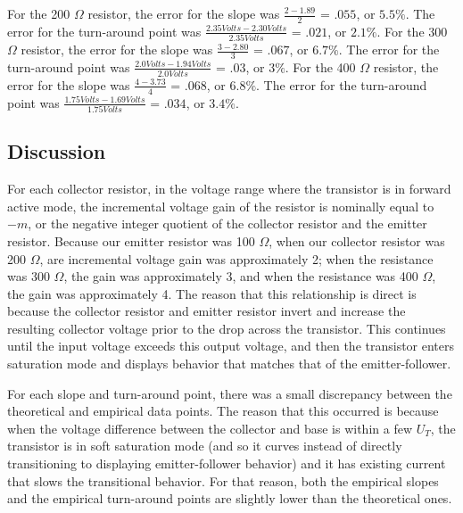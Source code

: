 \documentclass{article}
\begin{document}
For the 200 $\Omega$ resistor, the error for the slope was $\frac{2-1.89}{2}$ = $.055$, or $5.5\%$. The error for the turn-around point was $\frac{2.35 Volts -2.30 Volts}{2.35 Volts}$ = $.021$, or $2.1\%$. For the 300 $\Omega$ resistor, the error for the slope was $\frac{3-2.80}{3}$ = $.067$, or $6.7\%$. The error for the turn-around point was $\frac{2.0 Volts -1.94 Volts}{2.0 Volts}$ = $.03$, or $3\%$. For the 400 $\Omega$ resistor, the error for the slope was $\frac{4-3.73}{4}$ = $.068$, or $6.8\%$. The error for the turn-around point was $\frac{1.75 Volts - 1.69 Volts}{1.75 Volts }$ = $.034$, or $3.4\%$. 

\subsection{Discussion}

For each collector resistor, in the voltage range where the transistor is in forward active mode, the incremental voltage gain of the resistor is nominally equal to $-m$, or the negative integer quotient of the collector resistor and the emitter resistor. Because our emitter resistor was 100 $\Omega$, when our collector resistor was 200 $\Omega$, are incremental voltage gain was approximately 2; when the resistance was 300 $\Omega$, the gain was approximately 3, and when the resistance was 400 $\Omega$, the gain was approximately 4. The reason that this relationship is  direct is because the collector resistor and emitter resistor invert and increase the resulting collector voltage prior to the drop across the transistor. This continues until the input voltage exceeds this output voltage, and then the transistor enters saturation mode and displays behavior that matches that of the emitter-follower.

For each slope and turn-around point, there was a small discrepancy between the theoretical and empirical data points. The reason that this occurred is because when the voltage difference between the collector and base is within a few $U_T$, the transistor is in soft saturation mode (and so it curves instead of directly transitioning to displaying emitter-follower behavior) and it has existing current that slows the transitional behavior. For that reason, both the empirical slopes and the empirical turn-around points are slightly lower than the theoretical ones.  
\end{document}
